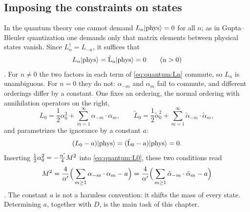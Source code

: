 \subsection{Imposing the constraints on states}

In the quantum theory one cannot demand $L_n|\rm phys\rangle=0$ for all $n$; as in
Gupta--Bleuler quantization one demands only that matrix elements between physical states
vanish. Since $L_n^\dagger=L_{-n}$, it suffices that
\begin{equation}\label{eq:quantum:phys}
 L_n|\rm phys\rangle=\tilde L_n|\rm phys\rangle=0\qquad (n>0)
\end{equation}
. For $n\neq0$ the two factors in each term of
\cref{eq:quantum:Ln} commute, so $L_n$ is unambiguous. For $n=0$ they do not: $\alpha_{-m}$
and $\alpha_m$ fail to commute, and different orderings differ by a constant. One fixes an
ordering, the normal ordering with annihilation operators on the right,
\begin{equation}\label{eq:quantum:L0}
 L_0=\frac12\alpha_0^2+\sum_{m=1}^\infty\alpha_{-m}\cdot\alpha_m ,\qquad
 \tilde L_0=\frac12\tilde\alpha_0^2+\sum_{m=1}^\infty\tilde\alpha_{-m}\cdot\tilde\alpha_m ,
\end{equation}
and parametrizes the ignorance by a constant $a$:
\begin{equation}\label{eq:quantum:L0a}
 (L_0-a)|\rm phys\rangle=(\tilde L_0-a)|\rm phys\rangle=0 .
\end{equation}
Inserting $\frac12\alpha_0^2=-\frac{\alpha'}4M^2$ into \cref{eq:quantum:L0}, these two conditions
read
\begin{equation}\label{eq:quantum:massL0a}
 M^2=\frac4{\alpha'}\Big(\sum_{m\ge1}\alpha_{-m}\cdot\alpha_m-a\Big)
    =\frac4{\alpha'}\Big(\sum_{m\ge1}\tilde\alpha_{-m}\cdot\tilde\alpha_m-a\Big)
\end{equation}
. The constant $a$ is not
a harmless convention: it shifts the mass of every state. Determining $a$, together with $D$,
is the main task of this chapter.

